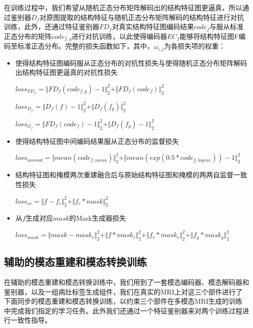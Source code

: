 \documentclass[letterpaper]{article} %
\begin{document}
在训练过程中，我们希望从随机正态分布矩阵解码出的结构特征图更逼真，所以通过鉴别器$D_f$对原图提取的结构特征与随机正态分布矩阵解码的结构特征进行对抗训练，此外，还通过特征鉴别器$FD_f$对真实结构特征图编码结果$code_f$与服从标准正态分布的矩阵$code_{f,g}$进行对抗训练，以此使得编码器$EC_f$能够将结构特征图F编码至标准正态分布。完整的损失函数如下，其中，$\omega_{i,j}$为各损失项的权重：
\begin{itemize}
	\item 使得结构特征图编码服从正态分布的对抗性损失与使得随机正态分布矩阵解码出结构特征图更逼真的对抗性损失

\begin{center}
	$loss_{FD_f}=\Vert{FD_f(code_{f,g})-1}\Vert_{2}^{2}+\Vert{FD_f(code_f)}\Vert_{2}^{2}$
\end{center}

\begin{center}
	$loss_{D_f}=\Vert{D_f(f)-1}\Vert_{2}^{2}+\Vert{D_f(f_g )}\Vert_{2}^{2}$
\end{center}

\begin{center}
	$loss_{G_f}=\Vert{FD_f(code_f)-1}\Vert_{2}^{2}+\Vert{D_f(f_g)-1}\Vert_{2}^{2}$
\end{center}

	\item 使得结构特征图中间编码结果服从正态分布的监督损失

\begin{center}
	$loss_{normal}=\Vert{mean(code_{f,mean})}\Vert_{2}^{2}+ \Vert{mean(exp(0.5*code_{f,logvar}))-1}\Vert_{2}^{2}$
\end{center}

	\item 结构特征图和掩模两次重建融合后与原始结构特征图和掩模的两两自监督一致性损失

\begin{center}
	$loss_{sv}=\Vert{f-f_r}\Vert_{2}^{2}+\Vert{f_r*mask}\Vert_{2}^{2}$
\end{center}

	\item 从$f$生成对应$mask$的Mask生成器损失

\begin{center}
	$loss_{mask}=\Vert{mask-mask_r }\Vert_{2}^{2}+\Vert{f*mask_r}\Vert_{2}^{2}+\Vert{f_r*mask_r}\Vert_{2}^{2}+\Vert{f_g*mask_g}\Vert_{2}^{2}$
\end{center}

\end{itemize}

\subsection{辅助的模态重建和模态转换训练}
在辅助的模态重建和模态转换训练中，我们用到了一套模态编码器、模态解码器和鉴别器，以及一组病灶标签生成组件，我们在真实的MRI上对这三个部件进行了下面同步的模态重建和模态转换训练，以约束三个部件在多模态MRI生成的训练中完成我们指定的学习任务。此外我们还通过一个特征鉴别器来对两个训练过程进行一致性指导。
\end{document}
